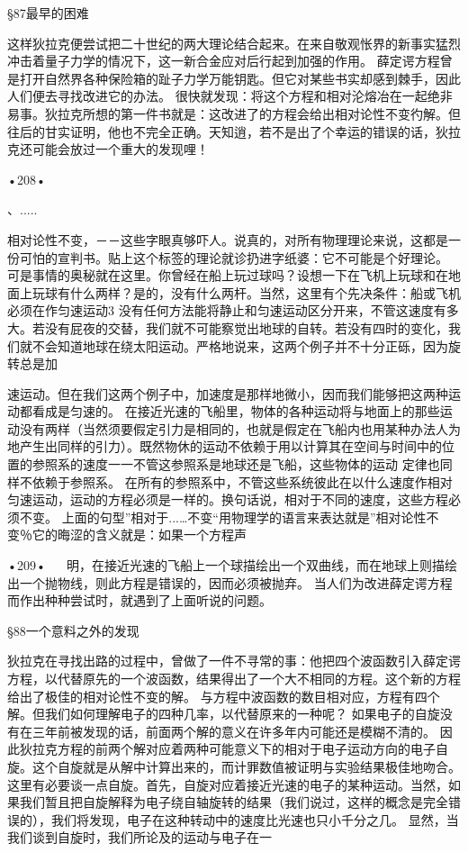 §87最早的困难

这样狄拉克便尝试把二十世纪的两大理论结合起来。在来自敬观怅界的新事实猛烈冲击着量子力学的情况下，这一新合金应对后行起到加强的作用。
薛定谔方程曾是打开自然界各种保险箱的趾子力学万能钥匙。但它对某些书实却感到棘手，因此人们便去寻找改进它的办法。
很快就发现：将这个方程和相对沦熔冶在一起绝非易事。狄拉克所想的第一件书就是：这改进了的方程会给出相对论性不变彴解。但往后的甘实证明，他也不完全正确。天知逍，若不是出了个幸运的错误的话，狄拉克还可能会放过一个重大的发现哩！

•208•
  

、.....
 
相对论性不变，－－这些字眼真够吓人。说真的，对所有物理理论来说，这都是一份可怕的宣判书。贴上这个标签的理论就诊扔进字纸婆：它不可能是个好理论。
可是事情的奥秘就在这里。你曾经在船上玩过球吗？设想一下在飞机上玩球和在地面上玩球有什么两样？是的，没有什么两杆。当然，这里有个先决条件：船或飞机必须在作匀速运动3
没有任何方法能将静止和匀速运动区分开来，不管这速度有多大。若没有屁夜的交替，我们就不可能察觉出地球的自转。若没有四时的变化，我们就不会知道地球在绕太阳运动。严格地说来，这两个例子并不十分正砾，因为旋转总是加

速运动。但在我们这两个例子中，加速度是那样地微小，因而我们能够把这两种运动都看成是匀速的。
在接近光速的飞船里，物体的各种运动将与地面上的那些运动没有两样（当然须要假定引力是相同的，也就是假定在飞船内也用某种办法人为地产生出同样的引力）。既然物休的运动不依赖于用以计算其在空间与时间中的位置的参照系的速度一一不管这参照系是地球还是飞船，这些物体的运动
定律也同样不依赖于参照系。
在所有的参照系中，不管这些系统彼此在以什么速度作相对匀速运动，运动的方程必须是一样的。换句话说，相对于不同的速度，这些方程必须不变。
上面的句型”相对于...…不变“用物理学的语言来表达就是”相对论性不变％它的晦涩的含义就是：如果一个方程声

•209•
  
明，在接近光速的飞船上一个球描绘出一个双曲线，而在地球上则描绘出一个抛物线，则此方程是错误的，因而必须被抛弃。
当人们为改进薛定谔方程而作出种种尝试时，就遇到了上面听说的问题。

§88一个意料之外的发现

狄拉克在寻找出路的过程中，曾做了一件不寻常的事：他把四个波函数引入薛定谔方程，以代替原先的一个波函数，结果得出了一个大不相同的方程。这个新的方程给出了极佳的相对论性不变的解。
与方程中波函数的数目相对应，方程有四个解。但我们如何理解电子的四种几率，以代替原来的一种呢？
如果电子的自旋没有在三年前被发现的话，前面两个解的意义在许多年内可能还是模糊不清的。
因此狄拉克方程的前两个解对应着两种可能意义下的相对于电子运动方向的电子自旋。这个自旋就是从解中计算出来的，而计罪数值被证明与实验结果极佳地吻合。
这里有必要谈一点自旋。首先，自旋对应着接近光速的电子的某种运动。当然，如果我们暂且把自旋解释为电子绕自轴旋转的结果（我们说过，这样的概念是完全错误的），我们将发现，电子在这种转动中的速度比光速也只小千分之几。
显然，当我们谈到自旋时，我们所论及的运动与电子在一

